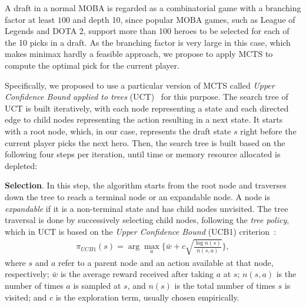
A draft in a normal MOBA is regarded as a combinatorial game with a branching factor at least $100$ and depth 10, since popular MOBA games, such as League of Legends and DOTA 2, support more than 100 heroes to be selected for each of the 10 picks in a draft. As the branching factor is very large in this case, which makes minimax hardly a feasible approach, we propose to apply MCTS to compute the optimal pick for the current player. 








Specifically, we proposed to use a particular version of MCTS called \textit{Upper Confidence Bound applied to trees} (UCT)~\citep{kocsis2006bandit} for this purpose. The search tree of UCT is built iteratively, with each node representing a state and each directed edge to child nodes representing the action resulting in a next state. It starts with a root node, which, in our case, represents the draft state $s$ right before the current player picks the next hero. Then, the search tree is built based on the following four steps per iteration, until time or memory resource allocated is depleted:


\textbf{Selection}. In this step, the algorithm starts from the root node and traverses down the tree to reach a terminal node or an expandable node. A node is \textit{expandable} if it is a non-terminal state and has child nodes unvisited. The tree traversal is done by successively selecting child nodes, following the \textit{tree policy}, which in UCT is based on the \textit{Upper Confidence Bound} (UCB1) criterion~\citep{auer2002finite}:
    \begin{equation}
    \begin{aligned}
    \pi_{UCB1}(s) = \arg\max_a \Big\{ \bar{w} + c \sqrt{\frac{\log n(s)}{n(s, a)}} \Big\},
    \label{eqn:ucb}
    \end{aligned}
    \end{equation}
where $s$ and $a$ refer to a parent node and an action available at that node, respectively; $\bar{w}$ is the average reward received after taking $a$ at $s$; $n(s,a)$ is the number of times $a$ is sampled at $s$, and $n(s)$ is the total number of times $s$ is visited; and $c$ is the exploration term, usually chosen empirically. 


